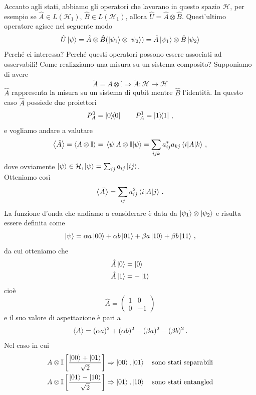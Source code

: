 Accanto agli stati, abbiamo gli operatori che lavorano in questo spazio $\mathcal{H}$, per esempio se $\hat A \in L(\mathcal{H}_1)$, $\hat B \in L(\mathcal{H}_1)$, allora $\hat U = \hat A \otimes \hat B$. Quest'ultimo operatore agisce nel seguente modo
\begin{equation*}
    \hat U \ket \psi = \hat A \otimes \hat B(\ket{\psi_1}\otimes\ket{\psi_2})=\hat A\ket{\psi_1}\otimes \hat B\ket{\psi_2}
\end{equation*}
Perché ci interessa? Perché questi operatori possono essere associati ad osservabili! Come realizziamo una misura su un sistema composito? Supponiamo di avere
\begin{equation*}
    \tilde{A}=A\otimes \mathbb{I} \Rightarrow \tilde{A}: \mathcal{H} \rightarrow \mathcal{H}
\end{equation*}
$\hat A$ rappresenta la misura su un sistema di qubit mentre $\hat B$ l'identità. In questo caso $\hat A$ possiede due proiettori
\begin{equation*}
    P_A^0 = \op{0}{0} \qquad P_A^1=\op{1}{1} \, ,
\end{equation*}
e vogliamo andare a valutare
\begin{equation*}
    \expval{\tilde{A}}=\expval{A\otimes \mathbb{I}}=\mel{\psi}{A \otimes \mathbb{I}}{\psi}=\sum_{ijk}a_{ij}^*a_{kj}\mel{i}{A}{k} \, ,
\end{equation*}
dove ovviamente $\ket \psi \in \mathcal{H}, \ket \psi = \sum_{ij}a_{ij}\ket{ij}$.\\
Otteniamo così
\begin{equation*}
    \expval{\tilde{A}}=\sum_{ij}a_{ij}^2\mel{i}{A}{j} \, .
\end{equation*}
La funzione d'onda che andiamo a considerare è data da $\ket{\psi_1}\otimes\ket{\psi_2}$ e risulta essere definita come
\begin{equation*}
    \ket \psi = \alpha a \ket{00} + \alpha b \ket{01} + \beta a \ket{10} + \beta b \ket{11}\, ,
\end{equation*}
da cui otteniamo che
\begin{align*}
    &\hat A \ket 0 = \ket 0 \\
    &\hat A \ket 1 = -\ket 1 
\end{align*}
cioè
\begin{equation*}
    \hat A = \begin{pmatrix}1 & 0 \\ 0 & -1 \end{pmatrix}
\end{equation*}
e il suo valore di aspettazione è pari a
\begin{equation*}
    \expval{A}=(\alpha a)^2 + (\alpha b)^2 - (\beta a)^2 - (\beta b)^2 \, .
\end{equation*}
Nel caso in cui
\begin{align*}
    &A\otimes\mathbb{I}\left[\frac{\ket{00}+\ket{01}}{\sqrt 2}\right] \Rightarrow \ket{00}, \ket{01} \quad \text{sono stati separabili} \\
    &A\otimes\mathbb{I}\left[\frac{\ket{01}-\ket{10}}{\sqrt 2}\right] \Rightarrow \ket{01}, \ket{10} \quad \text{sono stati entangled} \\
\end{align*}
